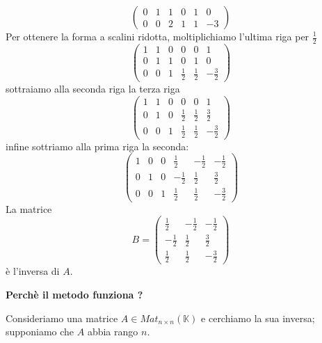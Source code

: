 \begin{example}
\begin{equation*}
\begin{pmatrix}
			0 & 1 & 1 & 0 & 1 & 0  \\
			0 & 0 & 2 & 1 & 1 & -3
		\end{pmatrix}
	\end{equation*}
	Per ottenere la forma a scalini ridotta, moltiplichiamo l'ultima riga per
	$\frac{1}{2}$
	\begin{equation*}
		\begin{pmatrix}
			1 & 1 & 0 & 0           & 0           & 1            \\
			0 & 1 & 1 & 0           & 1           & 0            \\
			0 & 0 & 1 & \frac{1}{2} & \frac{1}{2} & -\frac{3}{2}
		\end{pmatrix}
	\end{equation*}
	sottraiamo alla seconda riga la terza riga
	\begin{equation*}
		\begin{pmatrix}
			1 & 1 & 0 & 0           & 0           & 1            \\
			0 & 1 & 0 & \frac{1}{2} & \frac{1}{2} & \frac{3}{2}  \\
			0 & 0 & 1 & \frac{1}{2} & \frac{1}{2} & -\frac{3}{2}
		\end{pmatrix}
	\end{equation*}
	infine sottriamo alla prima riga la seconda:
	\begin{equation*}
		\begin{pmatrix}
			1 & 0 & 0 & \frac{1}{2}  & -\frac{1}{2} & -\frac{1}{2} \\
			0 & 1 & 0 & -\frac{1}{2} & \frac{1}{2}  & \frac{3}{2}  \\
			0 & 0 & 1 & \frac{1}{2}  & \frac{1}{2}  & -\frac{3}{2}
		\end{pmatrix}
	\end{equation*}
	La matrice
	\begin{equation*}
		B = \begin{pmatrix}
			\frac{1}{2}  & -\frac{1}{2} & -\frac{1}{2} \\
			-\frac{1}{2} & \frac{1}{2}  & \frac{3}{2}  \\
			\frac{1}{2}  & \frac{1}{2}  & -\frac{3}{2}
		\end{pmatrix}
	\end{equation*}
	\`e l'inversa di $A$.
\end{example}

\textbf{Perch\`e il metodo funziona ?}

Consideriamo una matrice $A \in Mat_{n \times n}(\mathbb{K})$ e cerchiamo la sua
inversa; supponiamo che $A$ abbia rango $n$.

